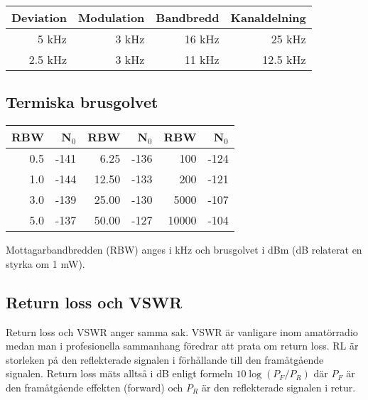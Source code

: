 \begin{center}
\begin{tabular}{rrrr}
Deviation & Modulation & Bandbredd & Kanaldelning\\ \hline
5 kHz & 3 kHz & 16 kHz & 25 kHz\\
2.5 kHz & 3 kHz & 11 kHz & 12.5 kHz\\
\end{tabular}
\end{center}

\subsection{Termiska brusgolvet}

\begin{center}
\begin{tabular}{rr|rr|rr}
	\textbf{RBW} & \textbf{N$_0$} & \textbf{RBW} & \textbf{N$_0$} & \textbf{RBW} & \textbf{N$_0$} \\ \hline
	         0.5 &           -141 &         6.25 &           -136 &          100 &           -124 \\
	         1.0 &           -144 &        12.50 &           -133 &          200 &           -121 \\
	         3.0 &           -139 &        25.00 &           -130 &         5000 &           -107 \\
	         5.0 &           -137 &        50.00 &           -127 &        10000 &           -104
\end{tabular}
\end{center}

Mottagarbandbredden (RBW) anges i kHz och brusgolvet i dBm (dB relaterat en styrka om 1 mW).

\subsection{Return loss och VSWR}

Return loss och VSWR anger samma sak. VSWR är vanligare inom amatörradio medan man i profesionella sammanhang föredrar att prata om return loss. RL är storleken på den reflekterade signalen i förhållande till den framåtgående signalen. Return loss mäts alltså i dB enligt formeln $10\log(P_F/P_R)$ där $P_F$ är den framåtgående effekten (forward) och  $P_R$ är den reflekterade signalen i retur.

